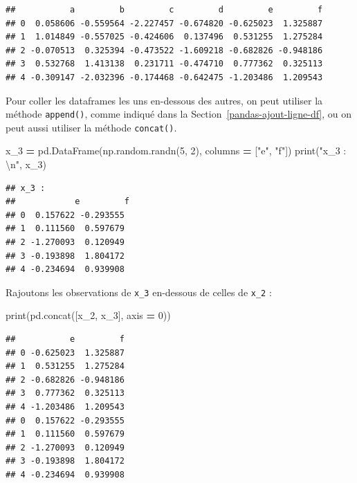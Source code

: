 \documentclass[12pt,]{book}
\newenvironment{Shaded}{\begin{snugshade}}{\end{snugshade}}
\newcommand{\DecValTok}[1]{\textcolor[rgb]{0.00,0.00,0.81}{#1}}
\newcommand{\CharTok}[1]{\textcolor[rgb]{0.31,0.60,0.02}{#1}}
\newcommand{\StringTok}[1]{\textcolor[rgb]{0.31,0.60,0.02}{#1}}
\newcommand{\OperatorTok}[1]{\textcolor[rgb]{0.81,0.36,0.00}{\textbf{#1}}}
\newcommand{\BuiltInTok}[1]{#1}
\newcommand{\NormalTok}[1]{#1}
\numberwithin{equation}{section}
\numberwithin{countremarque}{section}
\begin{document}
\begin{lstlisting}
##           a         b         c         d         e         f
## 0  0.058606 -0.559564 -2.227457 -0.674820 -0.625023  1.325887
## 1  1.014849 -0.557025 -0.424606  0.137496  0.531255  1.275284
## 2 -0.070513  0.325394 -0.473522 -1.609218 -0.682826 -0.948186
## 3  0.532768  1.413138  0.231711 -0.474710  0.777362  0.325113
## 4 -0.309147 -2.032396 -0.174468 -0.642475 -1.203486  1.209543
\end{lstlisting}

Pour coller les dataframes les uns en-dessous des autres, on peut
utiliser la méthode \texttt{append()}, comme indiqué dans la
Section~\ref{pandas-ajout-ligne-df}, ou on peut aussi utiliser la
méthode \texttt{concat()}.

\begin{Shaded}
\begin{Highlighting}[]
\NormalTok{x_3 }\OperatorTok{=}\NormalTok{ pd.DataFrame(np.random.randn(}\DecValTok{5}\NormalTok{, }\DecValTok{2}\NormalTok{),}
\NormalTok{                   columns }\OperatorTok{=}\NormalTok{ [}\StringTok{"e"}\NormalTok{, }\StringTok{"f"}\NormalTok{])}
\BuiltInTok{print}\NormalTok{(}\StringTok{"x_3 : }\CharTok{\textbackslash{}n}\StringTok{"}\NormalTok{, x_3)}
\end{Highlighting}
\end{Shaded}

\begin{lstlisting}
## x_3 : 
##            e         f
## 0  0.157622 -0.293555
## 1  0.111560  0.597679
## 2 -1.270093  0.120949
## 3 -0.193898  1.804172
## 4 -0.234694  0.939908
\end{lstlisting}

Rajoutons les observations de \texttt{x\_3} en-dessous de celles de
\texttt{x\_2} :

\begin{Shaded}
\begin{Highlighting}[]
\BuiltInTok{print}\NormalTok{(pd.concat([x_2, x_3], axis }\OperatorTok{=} \DecValTok{0}\NormalTok{))}
\end{Highlighting}
\end{Shaded}

\begin{lstlisting}
##           e         f
## 0 -0.625023  1.325887
## 1  0.531255  1.275284
## 2 -0.682826 -0.948186
## 3  0.777362  0.325113
## 4 -1.203486  1.209543
## 0  0.157622 -0.293555
## 1  0.111560  0.597679
## 2 -1.270093  0.120949
## 3 -0.193898  1.804172
## 4 -0.234694  0.939908
\end{lstlisting}
\end{document}
